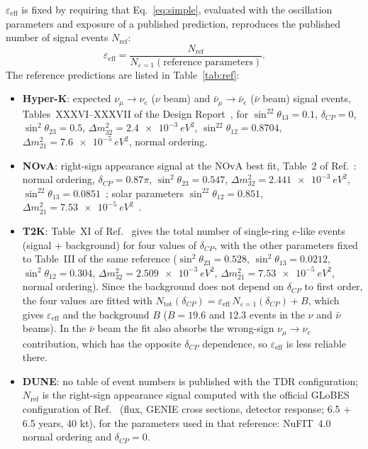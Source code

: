 \documentclass[11pt,a4paper]{article}
\newcommand{\numu}{\nu_\mu}
\newcommand{\numubar}{\bar\nu_\mu}
\newcommand{\nue}{\nu_e}
\newcommand{\nuebar}{\bar\nu_e}
\begin{document}
$\varepsilon_\text{eff}$ is fixed by requiring that Eq.~\eqref{eq:simple}, evaluated with the oscillation
parameters and exposure of a published prediction, reproduces the published number of signal events
$N_\text{ref}$:
\begin{equation}
  \varepsilon_\text{eff} = \frac{N_\text{ref}}{N_{\varepsilon=1}(\text{reference parameters})} .
\end{equation}
The reference predictions are listed in Table~\ref{tab:ref}:
\begin{itemize}
  \item \textbf{Hyper-K}: expected $\numu\to\nue$ ($\nu$ beam) and $\numubar\to\nuebar$ ($\bar\nu$ beam) signal
        events, Tables~XXXVI--XXXVII of the Design Report~\cite{Hyper-Kamiokande:2018ofw}, for
        $\sin^22\theta_{13}=0.1$, $\delta_{CP}=0$, $\sin^2\theta_{23}=0.5$,
        $\Delta m^2_{32}=\SI{2.4e-3}{eV^2}$, $\sin^22\theta_{12}=0.8704$, $\Delta m^2_{21}=\SI{7.6e-5}{eV^2}$, normal ordering.
  \item \textbf{NOvA}: right-sign appearance signal at the NOvA best fit, Table~2 of Ref.~\cite{NOvA:2025tmb}:
        normal ordering, $\delta_{CP}=0.87\pi$, $\sin^2\theta_{23}=0.547$, $\Delta m^2_{32}=\SI{2.441e-3}{eV^2}$,
        $\sin^22\theta_{13}=0.0851$~\cite{DayaBay:2022orm}; solar parameters $\sin^22\theta_{12}=0.851$,
        $\Delta m^2_{21}=\SI{7.53e-5}{eV^2}$~\cite{ParticleDataGroup:2024cfk}.
  \item \textbf{T2K}: Table~XI of Ref.~\cite{T2K:2021xwb} gives the total number of single-ring $e$-like events
        (signal + background) for four values of $\delta_{CP}$, with the other parameters fixed to Table~III of the
        same reference ($\sin^2\theta_{23}=0.528$, $\sin^2\theta_{13}=0.0212$, $\sin^2\theta_{12}=0.304$,
        $\Delta m^2_{32}=\SI{2.509e-3}{eV^2}$, $\Delta m^2_{21}=\SI{7.53e-5}{eV^2}$, normal ordering).
        Since the background does not depend on $\delta_{CP}$ to first order, the four values are fitted with
        $N_\text{tot}(\delta_{CP}) = \varepsilon_\text{eff}\,N_{\varepsilon=1}(\delta_{CP}) + B$, which gives
        $\varepsilon_\text{eff}$ and the background $B$ ($B = 19.6$ and $12.3$ events in the $\nu$ and $\bar\nu$ beams).
        In the $\bar\nu$ beam the fit also absorbs the wrong-sign $\numu\to\nue$ contribution, which has the opposite
        $\delta_{CP}$ dependence, so $\varepsilon_\text{eff}$ is less reliable there.
  \item \textbf{DUNE}: no table of event numbers is published with the TDR configuration; $N_\text{ref}$ is the
        right-sign appearance signal computed with the official GLoBES configuration of Ref.~\cite{DUNE:2021cuw}
        (flux, GENIE cross sections, detector response; 6.5 + 6.5 years, 40 kt), for the parameters used in that
        reference: NuFIT~4.0~\cite{Esteban:2018azc} normal ordering and $\delta_{CP}=0$.
\end{itemize}
\end{document}
